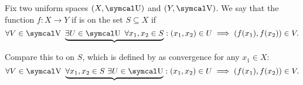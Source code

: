 \begin{definition}\label{def:uniform_continuity}\cite[435]{Engelking1989}
  Fix two uniform spaces \( (X, \CU) \) and \( (Y, \CV) \). We say that the function \( f: X \to Y \) if is  on the set \( S \subseteq X \) if
  \begin{equation}\label{def:uniform_continuity/uniform}
    \forall V \in \CV \ \underbrace{\exists U \in \CU \ \forall x_1, x_2 \in S} : (x_1, x_2) \in U \implies (f(x_1), f(x_2)) \in V.
  \end{equation}

  Compare this to  on \( S \), which is defined by  as convergence for any \( x_1 \in X \):
  \begin{equation}\label{def:uniform_continuity/pointwise}
    \forall V \in \CV \ \underbrace{\forall x_1, x_2 \in S \ \exists U \in \CU} : (x_1, x_2) \in U \implies (f(x_1), f(x_2)) \in V.
  \end{equation}
\end{definition}

